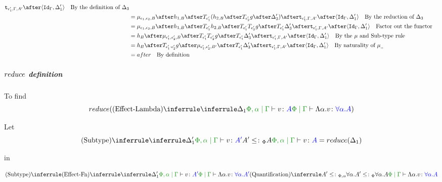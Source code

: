 {\begin{align}
                    \tstrength{\e_1'}{\G}{A'}\after\pr{\idg}{\D_1'}\qt{By the definition of $\D_3$}\\
                    &= \bind{\e_1}{\e_2}{B}\after 
                    h_{1, B}\after\T{\e_1'}{(h_{2, B}\after\T{\e_2'}{g}\after \D_3')}\after
                    \tstrength{\e_1'}{\G}{A'}\after\pr{\idg}{\D_1'}\qt{By the reduction of $\D_3$}\\
                    &= \bind{\e_1}{\e_2}{B}\after 
                    h_{1, B}\after\T{\e_1'}{h_{2, B}}\after\T{\e_1'}{\T{\e_2'}{g}}\after \T{\e_1'}{\D_3'}\after
                    \tstrength{\e_1'}{\G}{A'}\after\pr{\idg}{\D_1'}\qt{Factor out the functor}\\
                    &= h_B\after\bind{\e_1'}{\e_2'}{B}\after\T{\e_1'}{\T{\e_2'}{g}}\after \T{\e_1'}{\D_3'}\after
                    \tstrength{\e_1'}{\G}{A'}\after\pr{\idg}{\D_1'}\qt{By the $\mu$ and Sub-type rule }\\
                    & = h_B\after\T{\e_1'\dot\e_2'}{g}\after\bind{\e_1'}{\e_2'}{B'}\after \T{\e_1'}{\D_3'}\after
                    \tstrength{\e_1'}{\G}{A'}\after\pr{\idg}{\D_1'}\qt{By naturality of $\bind{}{}{}$ }\\
                    & = after \qt{By definition}
                \end{align}

        \subparagraph{$reduce$ definition}

        
        To find 
        \begin{equation}
            \reduce(\ntreeruleI{Effect-Lambda}{\treeruleI{\D_1}{\etyperelation{\P,\a}{\G}{v}{A}}}{\gpetyperelation{\elam{\a}{v}}{\all{\a}{A}}})
        \end{equation}

        Let
        \begin{equation}
            \ntreeruleII{Subtype}{\treeruleI{\D_1'}{\etyperelation{\P,\a}{\G}{v}{A'}}}{ A'\subtypep A}{\etyperelation{\P,\a}{\G}{v}{A}} = \reduce(\D_1)
        \end{equation}

        in 

        \begin{equation}
            \ntreeruleII{Subtype}{
                \ntreeruleI{Effect-Fn}{
                    \treeruleI{\D_1'}{\etyperelation{\P,\a}{\G}{v}{A'}}
                }{
                    \gpetyperelation{\elam{\a}{v}}{\all{\a}{A'}}
                }
            }{ 
            \ntreeruleI{Quantification}{A' \subtypepa}{\all{\a}{A'} \subtypep \all{\a}{A}}
            }{
                \gpetyperelation{\elam{\a}{v}}{\all{\a}{A}}
            }
        \end{equation}

}

